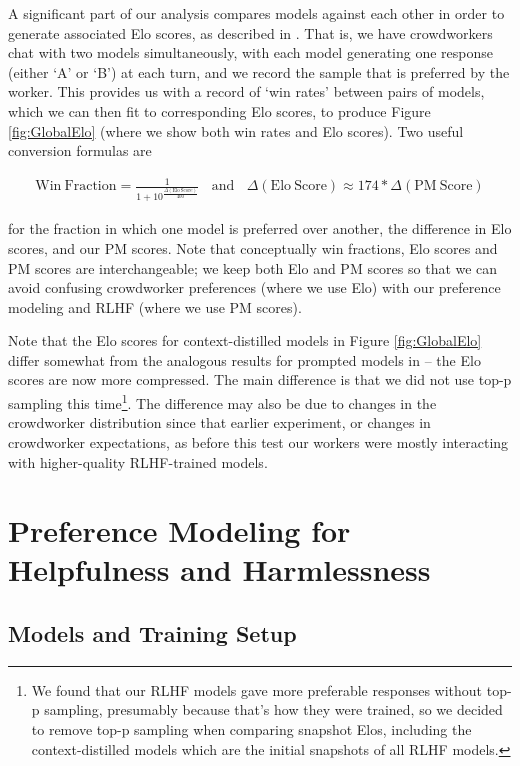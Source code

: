 A significant part of our analysis compares models against each other in order to generate associated Elo scores, as described in \cite{askell2021general}.  That is, we have crowdworkers chat with two models simultaneously, with each model generating one response (either `A' or `B') at each turn, and we record the sample that is preferred by the worker. This provides us with a record of `win rates' between pairs of models, which we can then fit to corresponding Elo scores, to produce Figure \ref{fig:GlobalElo} (where we show both win rates and Elo scores).  Two useful conversion formulas are

\begin{eqnarray}\label{eq:Elo}
\mathrm{Win \ Fraction} = \frac{1}{1 + 10^{\frac{\Delta (\mathrm{Elo \ Score})}{400}}} \ \ \ \ \mathrm{and} \ \ \ \ \Delta(\mathrm{Elo \ Score}) \approx 174 * \Delta (\mathrm{PM \ Score})
\end{eqnarray}

for the fraction in which one model is preferred over another, the difference in Elo scores, and our PM scores. Note that conceptually win fractions, Elo scores and PM scores are  interchangeable; we keep both Elo and PM scores so that we can avoid confusing crowdworker preferences (where we use Elo) with our preference modeling and RLHF (where we use PM scores).

Note that the Elo scores for context-distilled models in Figure \ref{fig:GlobalElo}  differ somewhat from the  analogous results for prompted models in \cite{askell2021general} -- the Elo scores are now more compressed.  The main difference is that we did not use top-p sampling this time\footnote{We found that our RLHF models gave more preferable responses without top-p sampling, presumably because that's how they were trained, so we decided to remove top-p sampling when comparing snapshot Elos, including the context-distilled models which are the initial snapshots of all RLHF models.}. The difference may also be due to changes in the crowdworker distribution since that earlier experiment, or changes in crowdworker expectations, as before this test our workers were mostly interacting with higher-quality RLHF-trained models. 

\section{Preference Modeling for Helpfulness and Harmlessness}
\label{sec:PM}

\subsection{Models and Training Setup}

